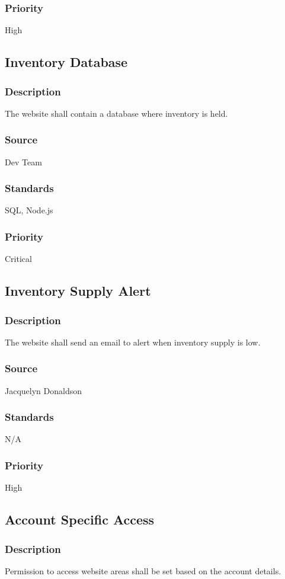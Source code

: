 \subsubsection{Priority}
High

\subsection{Inventory Database}
\subsubsection{Description}
The website shall contain a database where inventory is held.
\subsubsection{Source}
Dev Team
\subsubsection{Standards}
SQL, Node.js
\subsubsection{Priority}
Critical

\subsection{Inventory Supply Alert}
\subsubsection{Description}
The website shall send an email to alert when inventory supply is low.
\subsubsection{Source}
Jacquelyn Donaldson
\subsubsection{Standards}
N/A
\subsubsection{Priority}
High

\subsection{Account Specific Access}
\subsubsection{Description}
Permission to access website areas shall be set based on the account details.
